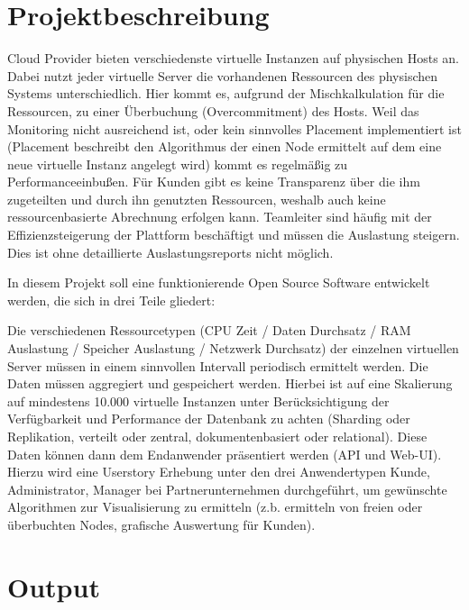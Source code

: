 \section{Projektbeschreibung}

Cloud Provider bieten verschiedenste virtuelle Instanzen auf physischen Hosts
an. Dabei nutzt jeder virtuelle Server die vorhandenen Ressourcen des
physischen Systems unterschiedlich. Hier kommt es, aufgrund der
Mischkalkulation für die Ressourcen, zu einer Überbuchung (Overcommitment) des
Hosts. Weil das Monitoring nicht ausreichend ist, oder kein sinnvolles
Placement implementiert ist (Placement beschreibt den Algorithmus der einen
Node ermittelt auf dem eine neue virtuelle Instanz angelegt wird) kommt es
regelmäßig zu Performanceeinbußen. Für Kunden gibt es keine Transparenz über
die ihm zugeteilten und durch ihn genutzten Ressourcen, weshalb auch keine
ressourcenbasierte Abrechnung erfolgen kann. Teamleiter sind häufig mit der
Effizienzsteigerung der Plattform beschäftigt und müssen die Auslastung
steigern. Dies ist ohne detaillierte Auslastungsreports nicht möglich.

In diesem Projekt soll eine funktionierende Open Source Software entwickelt
werden, die sich in drei Teile gliedert:
\begin{outline}
  \1 Die verschiedenen Ressourcetypen (CPU Zeit / Daten Durchsatz / RAM
  Auslastung / Speicher Auslastung / Netzwerk Durchsatz) der einzelnen
  virtuellen Server müssen in einem sinnvollen Intervall periodisch ermittelt
  werden.
  \1 Die Daten müssen aggregiert und gespeichert werden. Hierbei ist auf eine
  Skalierung auf mindestens 10.000 virtuelle Instanzen unter Berücksichtigung
  der Verfügbarkeit und Performance der Datenbank zu achten (Sharding oder
  Replikation, verteilt oder zentral, dokumentenbasiert oder relational).
  \1 Diese Daten können dann dem Endanwender präsentiert werden (API und
  Web-UI). Hierzu wird eine Userstory Erhebung unter den drei Anwendertypen
  Kunde, Administrator, Manager bei Partnerunternehmen durchgeführt, um
  gewünschte Algorithmen zur Visualisierung zu ermitteln (z.b. ermitteln von
  freien oder überbuchten Nodes, grafische Auswertung für Kunden).
\end{outline}

\section{Output}


